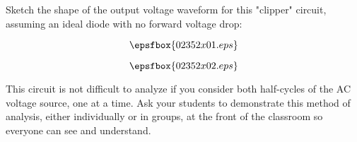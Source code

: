 

Sketch the shape of the output voltage waveform for this "clipper" circuit, assuming an ideal diode with no forward voltage drop:

$$\epsfbox{02352x01.eps}$$







$$\epsfbox{02352x02.eps}$$







This circuit is not difficult to analyze if you consider both half-cycles of the AC voltage source, one at a time.  Ask your students to demonstrate this method of analysis, either individually or in groups, at the front of the classroom so everyone can see and understand.




